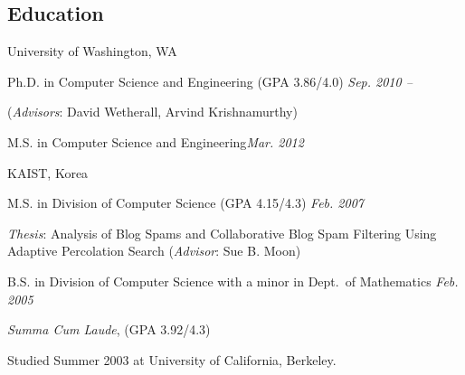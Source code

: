 \documentclass[margin,line]{res}
\newenvironment{list1}{
  \begin{list}{\ding{113}}{%
      \setlength{\itemsep}{0in}
      \setlength{\parsep}{0in} \setlength{\parskip}{0in}
      \setlength{\topsep}{0in} \setlength{\partopsep}{0in}
      \setlength{\leftmargin}{0.17in}}}{\end{list}}
\begin{document}
\begin{resume}
\section{\sc Education}
University of Washington, WA \\
\vspace*{-.1in}
\begin{list1}
\item[] Ph.D. in Computer Science and Engineering (GPA 3.86/4.0) \hfill{\it Sep. 2010 -- }
\item[] (\textit{Advisors}: David Wetherall, Arvind Krishnamurthy)
\item[] M.S. in Computer Science and Engineering\hfill{\it Mar. 2012}
\end{list1}


KAIST, Korea  \\
\vspace*{-.1in}
\begin{list1}
\item[] M.S. in Division of Computer Science (GPA 4.15/4.3) \hfill{\it Feb. 2007}
\item[] \textit{Thesis}: Analysis of Blog Spams and Collaborative Blog Spam Filtering Using Adaptive Percolation Search (\textit{Advisor}: Sue B. Moon)
\item[] 
\item[] B.S. in Division of Computer Science with a minor in Dept.~of Mathematics \hfill{\it Feb. 2005}
\item[] \textit{Summa Cum Laude}, (GPA 3.92/4.3)
\item[] Studied Summer 2003 at University of California, Berkeley. 
\end{list1}





\end{resume}
\end{document}
